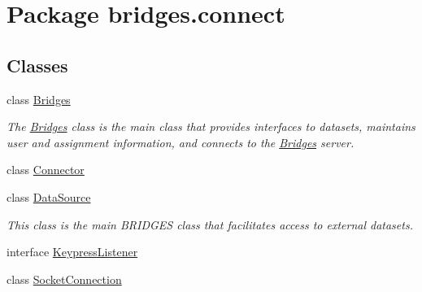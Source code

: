 \hypertarget{namespacebridges_1_1connect}{}\section{Package bridges.\+connect}
\label{namespacebridges_1_1connect}
\subsection*{Classes}
\begin{DoxyCompactItemize}
\item 
class \hyperlink{classbridges_1_1connect_1_1_bridges}{Bridges}
\begin{DoxyCompactList}\small\item\em The \hyperlink{classbridges_1_1connect_1_1_bridges}{Bridges} class is the main class that provides interfaces to datasets, maintains user and assignment information, and connects to the \hyperlink{classbridges_1_1connect_1_1_bridges}{Bridges} server. \end{DoxyCompactList}\item 
class \hyperlink{classbridges_1_1connect_1_1_connector}{Connector}
\item 
class \hyperlink{classbridges_1_1connect_1_1_data_source}{Data\+Source}
\begin{DoxyCompactList}\small\item\em This class is the main B\+R\+I\+D\+G\+ES class that facilitates access to external datasets. \end{DoxyCompactList}\item 
interface \hyperlink{interfacebridges_1_1connect_1_1_keypress_listener}{Keypress\+Listener}
\item 
class \hyperlink{classbridges_1_1connect_1_1_socket_connection}{Socket\+Connection}
\end{DoxyCompactItemize}

